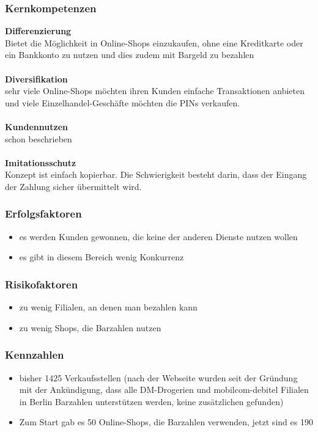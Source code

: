 \subsubsection{Kernkompetenzen}
\textbf{Differenzierung}\\
Bietet die Möglichkeit in Online-Shops einzukaufen, ohne eine Kreditkarte oder ein Bankkonto zu nutzen und dies zudem
mit Bargeld zu bezahlen\\
\\
\textbf{Diversifikation}\\
sehr viele Online-Shops möchten ihren Kunden einfache Transaktionen anbieten und viele Einzelhandel-Geschäfte möchten
die PINs verkaufen.\\
\\
\textbf{Kundennutzen}\\
schon beschrieben\\
\\
\textbf{Imitationsschutz}\\
Konzept ist einfach kopierbar. Die Schwierigkeit besteht darin, dass der Eingang der Zahlung sicher übermittelt wird.

\subsubsection{Erfolgsfaktoren}
\begin{itemize}
\item es werden Kunden gewonnen, die keine der anderen Dienste nutzen wollen
\item es gibt in diesem Bereich wenig Konkurrenz
\end{itemize}
\subsubsection{Risikofaktoren}
\begin{itemize}
\item zu wenig Filialen, an denen man bezahlen kann
\item zu wenig Shops, die Barzahlen nutzen
\end{itemize}
\subsubsection{Kennzahlen}
\begin{itemize}
\item bisher 1425 Verkaufsstellen (nach der Webseite wurden seit der Gründung mit der Ankündigung, dass alle DM-Drogerien
und mobilcom-debitel Filialen in Berlin Barzahlen unterstützen werden, keine zusätzlichen gefunden)
\item Zum Start gab es 50 Online-Shops, die Barzahlen verwenden, jetzt sind es 190
\end{itemize}
